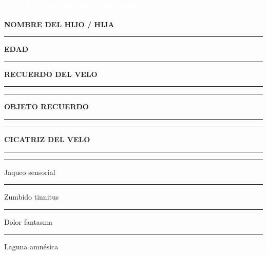 \documentclass[10pt,a4paper,oneside]{book}
\newcommand{\rulefield}[2][\linewidth]{%
  \begin{minipage}[t]{#1}
  \textcolor{InkSoft}{\industrialfont\scriptsize\bfseries\MakeUppercase{#2}}\par
  \vspace{1mm}\textcolor{Line}{\rule{\linewidth}{0.45pt}}
  \end{minipage}}
\newcommand{\strip}[1]{%
  \vspace{1mm}\noindent
  \colorbox{CarbonDark}{\parbox{\dimexpr\linewidth-2\fboxsep\relax}{%
    \textcolor{white}{\industrialfont\bfseries\small\MakeUppercase{#1}}}}\par
  \vspace{1mm}}
\newcommand{\checkline}[2]{%
  \textcolor{#1}{\rule{2.6mm}{2.6mm}}\hspace{1.2mm}\textcolor{InkSoft}{\scriptsize #2}}
\begin{document}
\begin{minipage}[t]{0.48\linewidth}
  \strip{02 // El juramento del linaje}
  \begin{tcolorbox}[enhanced,colback=BluePale,colframe=BurdinUrdin,boxrule=.6pt,
    arc=1mm,left=5pt,right=5pt,top=3pt,bottom=3pt,height=50mm]
    \scriptsize
    \rulefield{Nombre del hijo / hija}\par\vspace{1mm}
    \rulefield{Edad}\par\vspace{1mm}
    \rulefield{Recuerdo del Velo}\par\vspace{1mm}
    \textcolor{Line}{\rule{\linewidth}{.4pt}}\par\vspace{1mm}
    \vspace{1mm}
    \rulefield{Objeto recuerdo}\par\vspace{1mm}
    \textcolor{Line}{\rule{\linewidth}{.4pt}}\par\vspace{1mm}
    \rulefield{Cicatriz del Velo}\par\vspace{1mm}
    \checkline{BurdinUrdin}{Jaqueo sensorial}\hfill
    \checkline{BurdinUrdin}{Zumbido tinnitus}\par\vspace{1mm}
    \checkline{BurdinUrdin}{Dolor fantasma}\hfill
    \checkline{BurdinUrdin}{Laguna amnésica}
  \end{tcolorbox}
\end{minipage}\hfill
\end{document}
